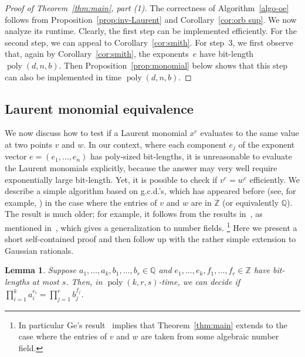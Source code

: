 \documentclass[10pt,a4paper]{article}
\DeclareMathOperator{\poly}{poly}
\newtheorem{lemma}[theorem]{Lemma}
\theoremstyle{definition}
\numberwithin{equation}{section}
\newcommand{\QQ}{\mathbb{Q}}
\newcommand{\ZZ}{\mathbb{Z}}
\begin{document}
\begin{proof} [Proof of Theorem~\ref{thm:main}, part (1)]
The correctness of Algorithm~\ref{algo-oe} follows from Proposition~\ref{prop:inv-Laurent} and Corollary~\ref{cor:orb sup}.
We now analyze its runtime.
Clearly, the first step can be implemented efficiently.
For the second step, we can appeal to Corollary~\ref{cor:smith}.
For step~3, we first observe that, again by Corollary~\ref{cor:smith}, the exponents~$e$ have bit-length $\poly(d,n,b)$.
Then Proposition~\ref{prop:monomial} below shows that this step can also be implemented in time $\poly(d,n,b)$.
\end{proof}

%
%

%
\subsection{Laurent monomial equivalence}\label{subsec:moneq}
%
We now discuss how to test if a Laurent monomial $x^e$ evaluates to the same value at two points $v$ and $w$.
In our context, where each component $e_j$ of the exponent vector $e = (e_1,\dots,e_n)$ has poly-sized bit-lengths, it is unreasonable to evaluate the Laurent monomials explicitly, because the answer may very well require exponentially large bit-length.
Yet, it is possible to check if $v^e = w^e$ efficiently.
We describe a simple algorithm based on g.c.d.'s, which has appeared before (see, for example, \cite{ESY14}) in the case where the entries of $v$ and $w$ are in $\ZZ$ (or equivalently $\QQ$).
The result is much older; for example, it follows from the results in~\cite{BDS}, as mentioned in~\cite{Ge93}, which gives a generalization to number fields.
\footnote{In particular Ge's result~\cite{Ge93} implies that Theorem~\ref{thm:main} extends to the case where the entries of $v$ and $w$ are taken from some algebraic number field.}
Here we present a short self-contained proof and then follow up with the rather simple extension to Gaussian rationals.

\begin{lemma}
Suppose $a_1,\dots,a_k,b_1,\dots,b_r \in\QQ$ and $e_1,\dots,e_k, f_1,\dots,f_r \in \ZZ$ have bit-lengths at most $s$.
Then, in $\poly(k,r,s)$-time, we can decide if $\prod_{i=1}^k a_i^{e_i} = \prod_{j=1}^r b_j^{f_j}$.
\end{lemma}
\end{document}
